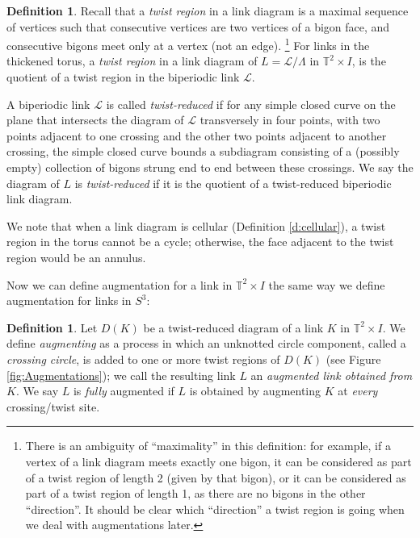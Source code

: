 \documentclass[11pt]{amsart}
\newcommand{\Sp}{{S}}
\newcommand{\torus}{{\mathbb{T}^2}}
\theoremstyle{plain}
\theoremstyle{definition}
\newtheorem{define}[theorem]{Definition}
\newtheorem{definition}[theorem]{Definition}
\begin{document}
\begin{define}
Recall that a \emph{twist region}
in a link diagram is a maximal sequence of vertices
such that consecutive vertices are two vertices of a bigon face,
and consecutive bigons meet only at a vertex (not an edge).
\footnote{There is an ambiguity of ``maximality'' in this definition:
for example, if a vertex of a link diagram meets exactly one bigon,
it can be considered as part of a twist region of length 2
(given by that bigon),
or it can be considered as part of a twist region of length 1,
as there are no bigons in the other ``direction''.
It should be clear which ``direction'' a twist region is going
when we deal with augmentations later.
}
For links in the thickened torus,
a \emph{twist region} in a link diagram of $L=\mathcal{L}/\Lambda$ in $\torus
\times I$, is the quotient of a twist region in the biperiodic link
$\mathcal{L}$. 


A biperiodic link
$\mathcal{L}$ is called \emph{twist-reduced} if for any simple closed curve on
the plane that intersects the diagram of $\mathcal{L}$
transversely in four points, with two
points adjacent to one crossing and the other two points adjacent to another
crossing, the simple closed curve bounds a subdiagram consisting of a (possibly
empty) collection of bigons strung end to end between these crossings. We say
the diagram of $L$ is \emph{twist-reduced}
if it is the quotient of a twist-reduced biperiodic
link diagram.
\end{define}


We note that when a link diagram is cellular
(Definition \ref{d:cellular}),
a twist region in the torus cannot be a cycle;
otherwise, the face adjacent to the twist region would be an annulus.


Now we can define augmentation for a link in $\torus \times I$ the same way we
define augmentation for links in $\Sp^3$:

\begin{definition}
Let $D(K)$ be a twist-reduced diagram of a link $K$ in $\torus \times I$.
We define
\emph{augmenting} as a process in which an unknotted circle component,
called a \emph{crossing circle},
is added to one or more twist regions of $D(K)$
(see Figure \ref{fig:Augmentations});
we call the resulting link $L$ an \emph{augmented link obtained from $K$}.
We say $L$ is \emph{fully} augmented if $L$ is obtained by augmenting
$K$ at \emph{every} crossing/twist site.
\label{d:augmentation}
\end{definition}
\end{document}
